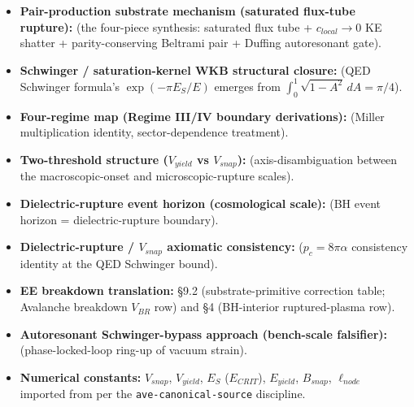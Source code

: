 \begin{itemize}
    \item \textbf{Pair-production substrate mechanism (saturated flux-tube rupture):}  (the four-piece synthesis: saturated flux tube + $c_{local} \to 0$ KE shatter + parity-conserving Beltrami pair + Duffing autoresonant gate).
    \item \textbf{Schwinger / saturation-kernel WKB structural closure:}  (QED Schwinger formula's $\exp(-\pi E_S/E)$ emerges from $\int_0^1 \sqrt{1-A^2}\,dA = \pi/4$).
    \item \textbf{Four-regime map (Regime III/IV boundary derivations):}  (Miller multiplication identity, sector-dependence treatment).
    \item \textbf{Two-threshold structure ($V_{yield}$ vs $V_{snap}$):}  (axis-disambiguation between the macroscopic-onset and microscopic-rupture scales).
    \item \textbf{Dielectric-rupture event horizon (cosmological scale):}  (BH event horizon = dielectric-rupture boundary).
    \item \textbf{Dielectric-rupture / $V_{snap}$ axiomatic consistency:}  ($p_c = 8\pi\alpha$ consistency identity at the QED Schwinger bound).
    \item \textbf{EE breakdown translation:}  \S 9.2 (substrate-primitive correction table; Avalanche breakdown $V_{BR}$ row) and \S 4 (BH-interior ruptured-plasma row).
    \item \textbf{Autoresonant Schwinger-bypass approach (bench-scale falsifier):}  (phase-locked-loop ring-up of vacuum strain).
    \item \textbf{Numerical constants:} $V_{snap}$, $V_{yield}$, $E_S$ ($E_{CRIT}$), $E_{yield}$, $B_{snap}$, $\ell_{node}$ imported from  per the \texttt{ave-canonical-source} discipline.
\end{itemize}

